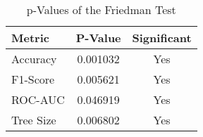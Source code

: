 
    \begin{table}[H]
        \centering
        \renewcommand{\arraystretch}{1.2}
        \caption{p-Values of the Friedman Test}
        \label{tab:fitness_test_friedman}
    \begin{tabular}{lcc}
\toprule
Metric & P-Value & Significant \\
\midrule
Accuracy & 0.001032 & Yes \\
F1-Score & 0.005621 & Yes \\
ROC-AUC & 0.046919 & Yes \\
Tree Size & 0.006802 & Yes \\
\bottomrule
\end{tabular}

        
    \end{table}
    